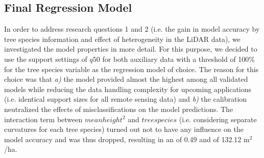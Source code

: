 \subsection{Final Regression Model}
\label{sec:regmod_final}

In order to address research questions 1 and 2 (i.e. the gain in model accuracy by tree species information and effect of heterogeneity in the LiDAR data), we investigated the model properties in more detail. For this purpose, we decided to use the support settings of $q50$ for both auxiliary data with a threshold of 100\% for the tree species variable as the regression model of choice. The reason for this choice was that \textit{a)} the model provided almost the highest \adjrsq{} among all validated models while reducing the data handling complexity for upcoming applications (i.e. identical support sizes for all remote sensing data) and \textit{b)} the calibration neutralized the effects of misclassifications on the model predictions. The interaction term between $meanheight^2$ and $treespecies$ (i.e. considering separate curvatures for each tree species) turned out not to have any influence on the model accuracy and was thus dropped, resulting in an \adjrsq{} of 0.49 and \rmsecv{} of 132.12 m$^2$/ha.

